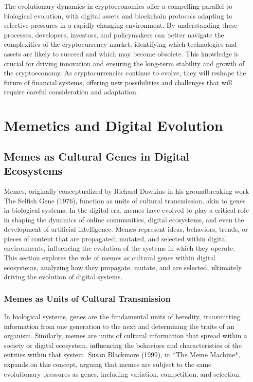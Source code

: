 \documentclass[12pt,twoside]{article}
\begin{document}
The evolutionary dynamics in cryptoeconomics offer a compelling parallel to biological evolution, with digital assets and blockchain protocols adapting to selective pressures in a rapidly changing environment. By understanding these processes, developers, investors, and policymakers can better navigate the complexities of the cryptocurrency market, identifying which technologies and assets are likely to succeed and which may become obsolete. This knowledge is crucial for driving innovation and ensuring the long-term stability and growth of the cryptoeconomy. As cryptocurrencies continue to evolve, they will reshape the future of financial systems, offering new possibilities and challenges that will require careful consideration and adaptation.

\section{Memetics and Digital Evolution}

\subsection{Memes as Cultural Genes in Digital Ecosystems}

Memes, originally conceptualized by Richard Dawkins in his groundbreaking work The Selfish Gene (1976), function as units of cultural transmission, akin to genes in biological systems. In the digital era, memes have evolved to play a critical role in shaping the dynamics of online communities, digital ecosystems, and even the development of artificial intelligence. Memes represent ideas, behaviors, trends, or pieces of content that are propagated, mutated, and selected within digital environments, influencing the evolution of the systems in which they operate. This section explores the role of memes as cultural genes within digital ecosystems, analyzing how they propagate, mutate, and are selected, ultimately driving the evolution of digital systems.

\subsubsection{Memes as Units of Cultural Transmission}

In biological systems, genes are the fundamental units of heredity, transmitting information from one generation to the next and determining the traits of an organism. Similarly, memes are units of cultural information that spread within a society or digital ecosystem, influencing the behaviors and characteristics of the entities within that system. Susan Blackmore (1999), in *The Meme Machine*, expands on this concept, arguing that memes are subject to the same evolutionary pressures as genes, including variation, competition, and selection.
\end{document}
